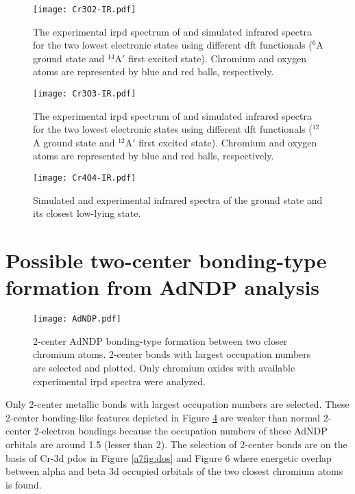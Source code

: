 \begin{refsection}
\begin{figure}[]
	\centering
	\texttt{[image: Cr3O2-IR.pdf]}
	\caption{The experimental \acrshort{irpd}  spectrum of  and simulated infrared spectra for the two lowest electronic states using different \acrshort{dft} functionals ($^6$A ground state and $^{14}$A$'$ first excited state). Chromium and oxygen atoms are represented by blue and red balls, respectively.}
	\label{a7fig:Cr3O2-IR}
\end{figure}

\begin{figure}[]
	\centering
	\texttt{[image: Cr3O3-IR.pdf]}
	\caption{The experimental \acrshort{irpd}  spectrum of  and simulated infrared spectra for the two lowest electronic states using different \acrshort{dft} functionals ($^{12}$A ground state and  $^{12}$A$'$ first excited state). Chromium and oxygen atoms are represented by blue and red balls, respectively.}
	\label{a7fig:Cr3O3-IR}
\end{figure}

\begin{figure}[]
	\centering
	\texttt{[image: Cr4O4-IR.pdf]}
	\caption{Simulated and experimental infrared spectra of the ground state and its closest low-lying state.}
	\label{a7fig:Cr4O4-IR}
\end{figure}

\FloatBarrier
\newpage


\section{Possible two-center bonding-type formation from AdNDP analysis}

\begin{figure}[ht!]
	\centering
	\texttt{[image: AdNDP.pdf]}
	\caption{2-center AdNDP bonding-type formation between two closer chromium atoms. 2-center bonds with largest occupation numbers are selected and plotted. Only chromium oxides with available experimental \acrshort{irpd}  spectra were analyzed.}
	\label{a7fig:AdNDP}
\end{figure}

Only 2-center metallic bonds with largest occupation numbers are selected. These 2-center bonding-like features depicted in Figure \ref{a7fig:AdNDP} are  weaker than normal 2-center 2-electron bondings because the occupation numbers of these AdNDP orbitals are around 1.5 (lesser than 2). The selection of 2-center bonds are on the basis of Cr-3d \acrshort{pdos} in Figure \ref{a7fig:dos} and Figure 6 where energetic overlap between alpha and beta 3d occupied orbitals of the two closest chromium atoms is found.


\end{refsection}
